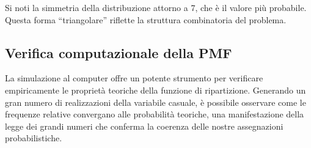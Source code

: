 \documentclass[
  letterpaper,
  DIV=11,
  numbers=noendperiod,
  oneside]{scrreprt}
\theoremstyle{definition}
\theoremstyle{plain}
\theoremstyle{definition}
\theoremstyle{remark}
\begin{document}
\begin{tcolorbox}
Si noti la simmetria della distribuzione attorno a 7, che è il valore
più probabile. Questa forma ``triangolare'' riflette la struttura
combinatoria del problema.

\end{tcolorbox}

\subsection{Verifica computazionale della
PMF}\label{verifica-computazionale-della-pmf}

La simulazione al computer offre un potente strumento per verificare
empiricamente le proprietà teoriche della funzione di ripartizione.
Generando un gran numero di realizzazioni della variabile casuale, è
possibile osservare come le frequenze relative convergano alle
probabilità teoriche, una manifestazione della legge dei grandi numeri
che conferma la coerenza delle nostre assegnazioni probabilistiche.
\end{document}
